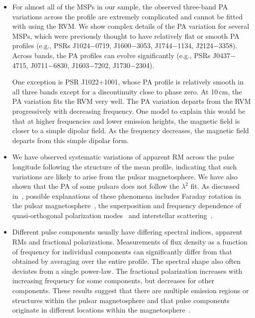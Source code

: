\documentclass[useAMS,usenatbib]{mn2e}
\begin{document}
\begin{itemize}
	

\item For almost all of the MSPs in our sample, the observed three-band PA variations across the profile 
	are extremely complicated and cannot be fitted with using the RVM. We show complex details of 
	the PA variation for several MSPs, which were previously thought to have relatively flat or smooth PA 
	profiles (e.g., PSRs J1024$-$0719, J1600$-$3053, J1744$-$1134, J2124$-$3358). Across bands, the 
	PA profiles can evolve significantly (e.g., PSRs J0437$-$4715, J0711$-$6830, J1603$-$7202, J1730$-$2304).

	One exception is PSR J1022$+$1001, whose PA profile is relatively smooth in all three bands 
	except for a discontinuity close to phase zero. At 10\,cm, the PA variation fits the RVM very 
	well. The PA variation departs from the RVM progressively with decreasing frequency.  One model to explain this would be that at higher frequencies and lower emission heights, the magnetic field is 
	closer to a simple dipolar field. As the frequency decreases, the magnetic field departs from 
	this simple dipolar form.
	
	
\item We have observed systematic variations of apparent RM across the pulse longitude following the 
	structure of the mean profile, indicating that such variations are likely to arise from the 
	pulsar magnetosphere. We have also shown that the PA of some pulsars does not follow the $\lambda^2$ 
	fit. As discussed in~\citet{Noutsos09}, possible explanations of these phenomena includes Faraday 
	rotation in the pulsar magnetosphere~\citep{Kennett98,Wang11}, the superposition and frequency 
	dependence of quasi-orthogonal polarization modes~\citep{Ramch04} and interstellar scattering~\citep{Kara09}.

\item	Different pulse components usually have differing spectral indices, apparent RMs and fractional 
	polarizations. Measurements of flux density as a function of frequency for individual components can significantly differ from that obtained by averaging over the entire profile. The spectral shape also often
	deviates from a single power-law. The fractional polarization increases with increasing frequency 
	for some components, but decreases for other components. These results suggest that there are multiple 
	emission regions or structures within the pulsar magnetosphere and that pulse components originate in 
	different locations within the magnetosphere~\citep[e.g.,][]{Dyks10}. 





\end{itemize}
\end{document}
